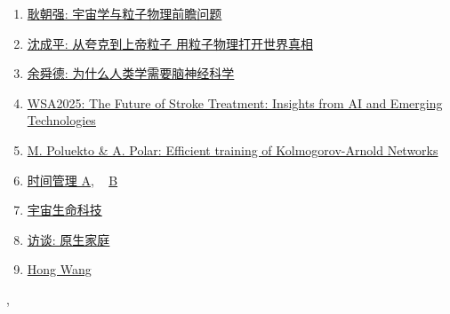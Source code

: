 \documentclass[11pt]{article}
\renewcommand{\today}{\shortmonthname[\the\month] \the \day,  \the\year}
\begin{document}
\begin{enumerate}
	\item \href{https://mp.weixin.qq.com/s/5OfUXxpPaf_clj0yRoxyTA}{耿朝强: 宇宙学与粒子物理前瞻问题}	%
	\item \href{https://mp.weixin.qq.com/s/hWlIRgg8AVSC-jTHJpN_Tg}{沈成平: 从夸克到上帝粒子 用粒子物理打开世界真相}	%
	\item \href{https://mp.weixin.qq.com/s/tMLB4FfYv9d9nb_bCFmSnA}{余舜德: 为什么人类学需要脑神经科学}	%
	\item \href{https://mp.weixin.qq.com/s/69TNSGhalcbiyZes2ItHNg}{WSA2025: The Future of Stroke Treatment: Insights from AI and Emerging Technologies}	%
	\item \href{https://mp.weixin.qq.com/s/u9U_RwAC0Gv3wOdP9QVjow}{M. Poluekto \& A. Polar: Efficient training of Kolmogorov-Arnold Networks}	%
	\item  \href{https://mp.weixin.qq.com/s/RCEL5QsWwj4csM_gzPI0Xw}{时间管理 A}, ~  \href{https://mp.weixin.qq.com/s/d5XTugV4AYyQLfvU9mhJuA}{B}	%
	\item \href{https://mp.weixin.qq.com/s/t4gZGLeT2Sh_BopZgF-Z0A}{宇宙生命科技}	%
	\item \href{https://mp.weixin.qq.com/s/K9wEpU1xzRt-ErnZw6WkOQ}{访谈: 原生家庭}	%
	\item \href{https://www.bilibili.com/video/BV1nZhr6YEkM?t=0.0}{Hong Wang}	%
\end{enumerate}




%
\begin{flushright}
	\tiny \today 
\end{flushright}
\end{document}
